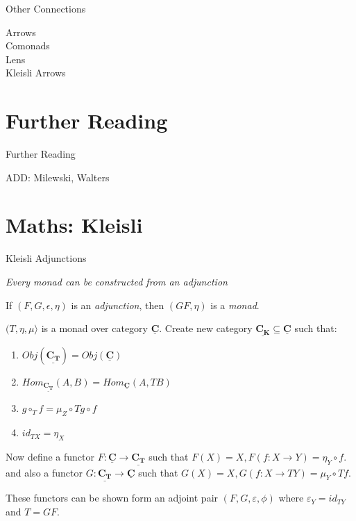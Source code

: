 \documentclass[10pt]{beamer}
\newcommand{\Cat}[1]{\ensuremath{\underline{\mathbf{#1}}}}
\theoremstyle{definition}
\theoremstyle{remark}
\numberwithin{equation}{section}
\begin{document}
\begin{frame}[fragile]{Other Connections}
  \begin{description}
  \item[Arrows] 
  \item[Comonads] 
  \item[Lens] 
  \item[Kleisli Arrows] 
  \item[] 
  \item[] 
  \item[] 
  \end{description}
\end{frame}

\section{Further Reading}

\begin{frame}[fragile]{Further Reading}

  ADD: Milewski, Walters
  
  \nocite{Elkins2009}
  
  

\end{frame}

\section{Maths: Kleisli}

\begin{frame}[fragile]{Kleisli Adjunctions}

  \emph{Every monad can be constructed from an adjunction}

  If $(F,G,\epsilon,\eta)$ is an \emph{adjunction}, then $(GF,\eta)$ is a \emph{monad}.

  $(T,\eta,\mu〉$ is a monad over category $\Cat{C}$.
    Create new category $\Cat{C_K} \subseteq \Cat{C}$ such that:

    \begin{enumerate}
      \item $Obj(\Cat{C_T}) = Obj(\Cat{C})$
      \item $Hom_{\Cat{C_T}}(A,B) = Hom_{\Cat{C}}(A,T B)$
      \item $g \circ_{T} f = \mu_{Z} \circ T g \circ f $
      \item $id_{TX} = \eta_{X} $
    \end{enumerate}

    Now define a functor $ F : \Cat{C} \rightarrow \Cat{C_T} $ such that $ F(X) = X, F(f:X\rightarrow Y) = \eta_Y\circ f$.
    and also a functor $ G : \Cat{C_T} \rightarrow \Cat{C} $ such that $ G(X) = X, G(f:X\rightarrow TY) = \mu_Y\circ Tf$.

    These functors can be shown form an adjoint pair $(F,G,\varepsilon,\phi)$ where $\varepsilon_{Y} = id_{TY}$ and $T = GF$.
    
\end{frame}
\end{document}
